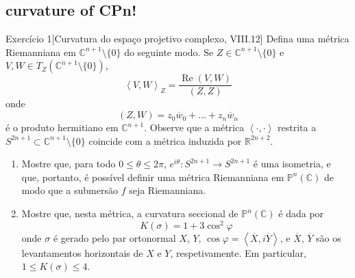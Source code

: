 \subsection{curvature of CPn!}

\begin{thing6}{Exercício 1}[Curvatura do espaço projetivo complexo, \cite{doc} VIII.12]\label{exer:1}\leavevmode
Defina uma métrica Riemanniana  em \(\mathbb{C}^{n+1}\setminus\{0\}\) do seguinte modo. Se \(Z \in \mathbb{C}^{n+1}\setminus\{0\}\) e \(V,W \in T_Z (\mathbb{C}^{n+1}\setminus\{0\})\),
\[\left<V,W\right>_Z=\frac{\operatorname{Re}(V,W)}{(Z,Z)}\]
onde 
\[(Z,W)=z_0\overline{w}_0+\ldots+z_n\overline{w}_n\]
é o produto hermitiano em \(\mathbb{C}^{n+1}\). Observe que a métrica \(\left<\cdot,\cdot\right>\) restrita a \(S^{2n+1}\subset \mathbb{C}^{n+1}\setminus\{0\}\) coincide com a métrica induzida por \(\mathbb{R}^{2n+2}\).
\begin{enumerate}[label=(\alph*)]
\item Mostre que, para todo \(0\leq \theta \leq 2\pi\), \(e^{i\theta}:S^{2n+1}\to S^{2n+1}\) é uma isometria, e que, portanto, é possível definir uma métrica Riemanniana em \(\mathbb{P}^n(\mathbb{C})\) de modo que a submersão \(f\) seja Riemanniana.

\item Mostre que, nesta métrica, a curvatura seccional de \(\mathbb{P}^n(\mathbb{C})\) é dada por
\[\boxed{K(\sigma)=1+3\cos^2\varphi}\]
onde \(\sigma\) é gerado pelo par ortonormal \(X\), \(Y\), \(\cos \varphi=\left<\overline{X},i\overline{Y}\right>\), e \(\overline{X}\), \(\overline{Y}\) são os levantamentos horizontais de \(X\) e \(Y\), respetivamente. Em particular, \(1 \leq  K(\sigma) \leq  4\).
\end{enumerate}
\end{thing6}

